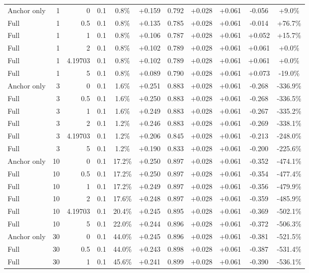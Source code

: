\begin{table}[htbp]
\begin{tabular}{lrrrccccccc}
Anchor only & 1 & 0 & 0.1 & 0.8\% & +0.159 & 0.792 & +0.028 & +0.061 & -0.056 & +9.0\% \\
Full & 1 & 0.5 & 0.1 & 0.8\% & +0.135 & 0.785 & +0.028 & +0.061 & -0.014 & +76.7\% \\
Full & 1 & 1 & 0.1 & 0.8\% & +0.106 & 0.787 & +0.028 & +0.061 & +0.052 & +15.7\% \\
Full & 1 & 2 & 0.1 & 0.8\% & +0.102 & 0.789 & +0.028 & +0.061 & +0.061 & +0.0\% \\
Full & 1 & 4.19703 & 0.1 & 0.8\% & +0.102 & 0.789 & +0.028 & +0.061 & +0.061 & +0.0\% \\
Full & 1 & 5 & 0.1 & 0.8\% & +0.089 & 0.790 & +0.028 & +0.061 & +0.073 & -19.0\% \\
Anchor only & 3 & 0 & 0.1 & 1.6\% & +0.251 & 0.883 & +0.028 & +0.061 & -0.268 & -336.9\% \\
Full & 3 & 0.5 & 0.1 & 1.6\% & +0.250 & 0.883 & +0.028 & +0.061 & -0.268 & -336.5\% \\
Full & 3 & 1 & 0.1 & 1.6\% & +0.249 & 0.883 & +0.028 & +0.061 & -0.267 & -335.2\% \\
Full & 3 & 2 & 0.1 & 1.2\% & +0.246 & 0.883 & +0.028 & +0.061 & -0.269 & -338.1\% \\
Full & 3 & 4.19703 & 0.1 & 1.2\% & +0.206 & 0.845 & +0.028 & +0.061 & -0.213 & -248.0\% \\
Full & 3 & 5 & 0.1 & 1.2\% & +0.190 & 0.833 & +0.028 & +0.061 & -0.200 & -225.6\% \\
Anchor only & 10 & 0 & 0.1 & 17.2\% & +0.250 & 0.897 & +0.028 & +0.061 & -0.352 & -474.1\% \\
Full & 10 & 0.5 & 0.1 & 17.2\% & +0.250 & 0.897 & +0.028 & +0.061 & -0.354 & -477.4\% \\
Full & 10 & 1 & 0.1 & 17.2\% & +0.249 & 0.897 & +0.028 & +0.061 & -0.356 & -479.9\% \\
Full & 10 & 2 & 0.1 & 17.6\% & +0.248 & 0.897 & +0.028 & +0.061 & -0.359 & -485.9\% \\
Full & 10 & 4.19703 & 0.1 & 20.4\% & +0.245 & 0.895 & +0.028 & +0.061 & -0.369 & -502.1\% \\
Full & 10 & 5 & 0.1 & 22.0\% & +0.244 & 0.896 & +0.028 & +0.061 & -0.372 & -506.3\% \\
Anchor only & 30 & 0 & 0.1 & 44.0\% & +0.245 & 0.896 & +0.028 & +0.061 & -0.381 & -521.5\% \\
Full & 30 & 0.5 & 0.1 & 44.0\% & +0.243 & 0.898 & +0.028 & +0.061 & -0.387 & -531.4\% \\
Full & 30 & 1 & 0.1 & 45.6\% & +0.241 & 0.899 & +0.028 & +0.061 & -0.390 & -536.1\% \\

\end{tabular}
\end{table}

